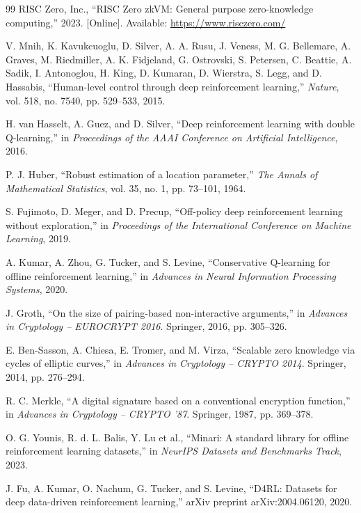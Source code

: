 \documentclass[12pt,a4paper,oneside]{report}
\begin{document}
\begin{thebibliography}{99}
RISC Zero, Inc.,
``RISC Zero zkVM: General purpose zero-knowledge computing,''
2023. [Online]. Available: \url{https://www.risczero.com/}

V. Mnih, K. Kavukcuoglu, D. Silver, A. A. Rusu, J. Veness, M. G. Bellemare, A. Graves, M. Riedmiller, A. K. Fidjeland, G. Ostrovski, S. Petersen, C. Beattie, A. Sadik, I. Antonoglou, H. King, D. Kumaran, D. Wierstra, S. Legg, and D. Hassabis,
``Human-level control through deep reinforcement learning,''
\textit{Nature}, vol. 518, no. 7540, pp. 529--533, 2015.

H. van Hasselt, A. Guez, and D. Silver,
``Deep reinforcement learning with double Q-learning,''
in \textit{Proceedings of the AAAI Conference on Artificial Intelligence}, 2016.

P. J. Huber,
``Robust estimation of a location parameter,''
\textit{The Annals of Mathematical Statistics}, vol. 35, no. 1, pp. 73--101, 1964.

S. Fujimoto, D. Meger, and D. Precup,
``Off-policy deep reinforcement learning without exploration,''
in \textit{Proceedings of the International Conference on Machine Learning}, 2019.

A. Kumar, A. Zhou, G. Tucker, and S. Levine,
``Conservative Q-learning for offline reinforcement learning,''
in \textit{Advances in Neural Information Processing Systems}, 2020.

J. Groth,
``On the size of pairing-based non-interactive arguments,''
in \textit{Advances in Cryptology -- EUROCRYPT 2016}.
Springer, 2016, pp. 305--326.

E. Ben-Sasson, A. Chiesa, E. Tromer, and M. Virza,
``Scalable zero knowledge via cycles of elliptic curves,''
in \textit{Advances in Cryptology -- CRYPTO 2014}.
Springer, 2014, pp. 276--294.

R. C. Merkle,
``A digital signature based on a conventional encryption function,''
in \textit{Advances in Cryptology -- CRYPTO '87}.
Springer, 1987, pp. 369--378.

O. G. Younis, R. d. L. Balis, Y. Lu et al.,
``Minari: A standard library for offline reinforcement learning datasets,''
in \textit{NeurIPS Datasets and Benchmarks Track}, 2023.

J. Fu, A. Kumar, O. Nachum, G. Tucker, and S. Levine,
``D4RL: Datasets for deep data-driven reinforcement learning,''
arXiv preprint arXiv:2004.06120, 2020.


\end{thebibliography}
\end{document}

